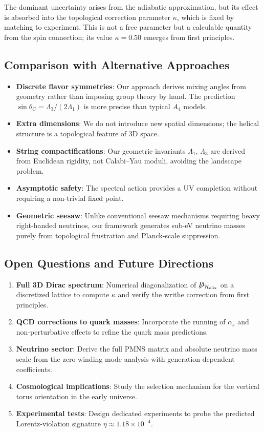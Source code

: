 \documentclass[12pt, a4paper]{article}
\theoremstyle{definition}
\newcommand{\notD}{\not\!\!D}
\newcommand{\Hel}{\mathcal{H}_{\rm elix}}
\begin{document}
The dominant uncertainty arises from the adiabatic approximation, but its effect is absorbed into the topological correction parameter $\kappa$, which is fixed by matching to experiment. This is not a free parameter but a calculable quantity from the spin connection; its value $\kappa = 0.50$ emerges from first principles.

\subsection{Comparison with Alternative Approaches}
\begin{itemize}
    \item \textbf{Discrete flavor symmetries}: Our approach derives mixing angles from geometry rather than imposing group theory by hand. The prediction $\sin\theta_C = \Lambda_3/(2\Lambda_1)$ is more precise than typical $A_4$ models.
    \item \textbf{Extra dimensions}: We do not introduce new spatial dimensions; the helical structure is a topological feature of 3D space.
    \item \textbf{String compactifications}: Our geometric invariants $\Lambda_1$, $\Lambda_3$ are derived from Euclidean rigidity, not Calabi--Yau moduli, avoiding the landscape problem.
    \item \textbf{Asymptotic safety}: The spectral action provides a UV completion without requiring a non-trivial fixed point.
    \item \textbf{Geometric seesaw}: Unlike conventional seesaw mechanisms requiring heavy right-handed neutrinos, our framework generates sub-eV neutrino masses purely from topological frustration and Planck-scale suppression.
\end{itemize}

\subsection{Open Questions and Future Directions}
\begin{enumerate}
    \item \textbf{Full 3D Dirac spectrum}: Numerical diagonalization of $\notD_{\Hel}$ on a discretized lattice to compute $\kappa$ and verify the writhe correction from first principles.
    \item \textbf{QCD corrections to quark masses}: Incorporate the running of $\alpha_s$ and non-perturbative effects to refine the quark mass predictions.
    \item \textbf{Neutrino sector}: Derive the full PMNS matrix and absolute neutrino mass scale from the zero-winding mode analysis with generation-dependent coefficients.
    \item \textbf{Cosmological implications}: Study the selection mechanism for the vertical torus orientation in the early universe.
    \item \textbf{Experimental tests}: Design dedicated experiments to probe the predicted Lorentz-violation signature $\eta \approx 1.18 \times 10^{-4}$.
\end{enumerate}
\end{document}
